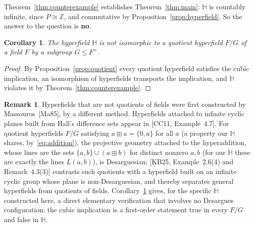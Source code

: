 \documentclass[12pt]{article}
\theoremstyle{plain}
\newtheorem{corollary}[theorem]{Corollary}
\theoremstyle{definition}
\newtheorem{remark}[theorem]{Remark}
\newcommand{\Z}{\mathbb{Z}}
\newcommand{\Hh}{\mathbb{H}}
\newcommand{\bp}{\boxplus}
\begin{document}
Theorem~\ref{thm:counterexample} establishes Theorem~\ref{thm:main}:
$\Hh$ is countably infinite, since $P\cong\Z$, and commutative by
Proposition~\ref{prop:hyperfield}.  So the answer to the question is
\textbf{no}.

\begin{corollary}\label{cor:nonquotient}
The hyperfield $\Hh$ is not isomorphic to a quotient hyperfield $F/G$
of a field $F$ by a subgroup $G\leq F^\times$.
\end{corollary}
\begin{proof}
By Proposition~\ref{prop:quotient} every quotient hyperfield satisfies
the cubic implication, an isomorphism of hyperfields transports the
implication, and $\Hh$ violates it by Theorem~\ref{thm:counterexample}.
\end{proof}

\begin{remark}\label{rem:context}
Hyperfields that are not quotients of fields were first constructed by
Massouros~[Ma85], by a different method.  Hyperfields attached to
infinite cyclic planes built from Hall's difference sets appear in
[CC11, Example~4.7].  For quotient hyperfields $F/G$ satisfying
$a\bp a=\{0,a\}$ for all $a$ (a property our $\Hh$ shares,
by~\eqref{eq:addition}), the projective geometry attached to the
hyperaddition, whose lines are the sets $\{a,b\}\cup(a\bp b)$ for
distinct nonzero $a,b$ (for our $\Hh$ these are exactly the lines
$L(a,b)$), is Desarguesian; [KB25, Example~2.6(4) and Remark~4.3(3)]
contrasts such quotients with a hyperfield built on an infinite cyclic
group whose plane is non-Desarguesian, and thereby separates general
hyperfields from quotients of fields.
Corollary~\ref{cor:nonquotient} gives, for the specific $\Hh$
constructed here, a direct elementary verification that involves no
Desargues configuration: the cubic implication is a first-order
statement true in every $F/G$ and false in $\Hh$.
\end{remark}
\end{document}
